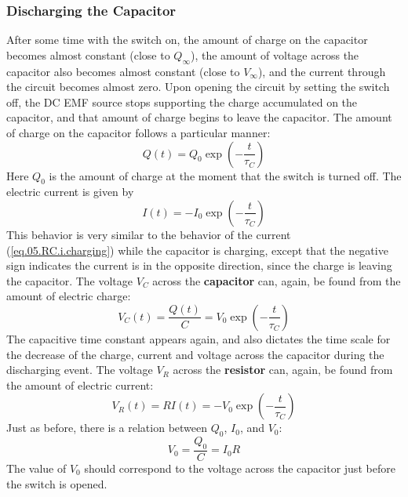 \subsubsection{Discharging the Capacitor}
%
After some time with the switch on, the amount of charge on the capacitor becomes almost constant (close to $Q_{\infty}$), the amount of voltage across the capacitor also becomes almost constant (close to $V_{\infty}$), and the current through the circuit becomes almost zero. Upon opening the circuit by setting the switch off, the DC EMF source stops supporting the charge accumulated on the capacitor, and that amount of charge begins to leave the capacitor. The amount of charge on the capacitor follows a particular manner:
\begin{equation}
    Q(t) = Q_{0} \exp\left(-\frac{t}{\tau_{C}}\right)
    \label{eq.05.RC.q.discharging}
\end{equation}
Here $Q_{0}$ is the amount of charge at the moment that the switch is turned off. The electric current is given by
\begin{equation}
    I(t) = - I_{0} \exp\left(-\frac{t}{\tau_{C}}\right)
    \label{eq.05.RC.i.discharging}
\end{equation}
This behavior is very similar to the behavior of the current (\ref{eq.05.RC.i.charging}) while the capacitor is charging, except that the negative sign indicates the current is in the opposite direction, since the charge is leaving the capacitor. The voltage $V_{C}$ across the \textbf{capacitor} can, again, be found from the amount of electric charge:
\begin{equation}
    V_{C}(t) = \frac{Q(t)}{C} = V_{0} \exp\left(-\frac{t}{\tau_{C}}\right)
    \label{eq.05.RC.vC.discharging}
\end{equation}
The capacitive time constant appears again, and also dictates the time scale for the decrease of the charge, current and voltage across the capacitor during the discharging event. The voltage $V_{R}$ across the \textbf{resistor} can, again, be found from the amount of electric current:
\begin{equation}
    V_{R}(t) = R I(t) = - V_{0} \exp\left(-\frac{t}{\tau_{C}}\right)
\end{equation}
Just as before, there is a relation between $Q_{0}$, $I_{0}$, and $V_{0}$:
\begin{equation}
    V_{0} = \frac{Q_{0}}{C} = I_{0} R
\end{equation}
The value of $V_{0}$ should correspond to the voltage across the capacitor just before the switch is opened.
%

